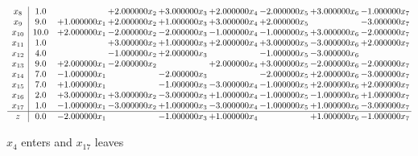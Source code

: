\documentclass[10pt]{article}
\begin{document}
\[\begin{array}{c| c c@{\hskip 2pt} c@{\hskip 2pt} c@{\hskip 2pt} c@{\hskip 2pt} c@{\hskip 2pt} c@{\hskip 2pt} c@{\hskip 2pt} }
 x_{8}   &  1.0  &   & + 2.000000 x_{2} & + 3.000000 x_{3} & + 2.000000 x_{4} & -2.000000 x_{5} & + 3.000000 x_{6} & -1.000000 x_{7}\\
 x_{9}   &  9.0 & + 1.000000 x_{1} & + 2.000000 x_{2} & + 1.000000 x_{3} & + 3.000000 x_{4} & + 2.000000 x_{5} &   & -3.000000 x_{7}\\
 x_{10}   &  10.0 & + 2.000000 x_{1} & -2.000000 x_{2} & -2.000000 x_{3} & -1.000000 x_{4} & -1.000000 x_{5} & + 3.000000 x_{6} & -2.000000 x_{7}\\
 x_{11}   &  1.0  &   & + 3.000000 x_{2} & + 1.000000 x_{3} & + 2.000000 x_{4} & + 3.000000 x_{5} & -3.000000 x_{6} & + 2.000000 x_{7}\\
 x_{12}   &  4.0  &   & -1.000000 x_{2} & + 2.000000 x_{3} &   & -1.000000 x_{5} & -3.000000 x_{6} &   \\
 x_{13}   &  9.0 & + 2.000000 x_{1} & -2.000000 x_{2} &   & + 2.000000 x_{4} & + 3.000000 x_{5} & -2.000000 x_{6} & -2.000000 x_{7}\\
 x_{14}   &  7.0 & -1.000000 x_{1} &   & -2.000000 x_{3} &   & -2.000000 x_{5} & + 2.000000 x_{6} & -3.000000 x_{7}\\
 x_{15}   &  7.0 & + 1.000000 x_{1} &   & -1.000000 x_{3} & -3.000000 x_{4} & -1.000000 x_{5} & + 2.000000 x_{6} & + 2.000000 x_{7}\\
 x_{16}   &  2.0 & + 3.000000 x_{1} & + 3.000000 x_{2} & -3.000000 x_{3} & + 1.000000 x_{4} & -1.000000 x_{5} & -1.000000 x_{6} & + 1.000000 x_{7}\\
 x_{17}   &  1.0 & -1.000000 x_{1} & -3.000000 x_{2} & + 1.000000 x_{3} & -3.000000 x_{4} & -1.000000 x_{5} & + 1.000000 x_{6} & -3.000000 x_{7}\\
\hline
z    &  0.0 & -2.000000 x_{1} &   & -1.000000 x_{3} & + 1.000000 x_{4} &   & + 1.000000 x_{6} & -1.000000 x_{7}\\
\end{array}\]


 $ x_{4} $ enters and $ x_{17} $ leaves 
\end{document}
